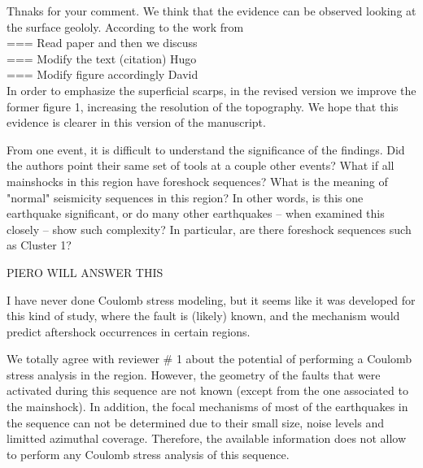 \documentclass[10pt]{extarticle}
\begin{document}
\begin{Answer}
Thnaks for your comment. We think that the evidence can be observed looking at the surface geololy. According to the work from \cite{Falcucci2016active} \\
\hfill === Read paper and then we discuss \\ 
\hfill ===  Modify the text (citation) Hugo \\
\hfill ===  Modify figure accordingly  David\\
In order to emphasize the superficial scarps, in the revised version we improve the former figure 1, increasing the resolution of the topography. We hope that this evidence is clearer in this version of the manuscript.
 \WorkInProgressRevTask
\end{Answer}
%
%



\begin{ReviewerComment}{1}
\noindent 
From one event, it is difficult to understand the significance of the findings. Did the authors point their same set of tools at a couple other events? What if all mainshocks in this region have foreshock sequences? What is the meaning of "normal" seismicity sequences in this region? In other words, is this one earthquake significant, or do many other earthquakes -- when examined this closely -- show such complexity? In particular, are there foreshock sequences such as Cluster 1?

\end{ReviewerComment}


\begin{Answer}
\hfill PIERO WILL ANSWER THIS
 \WorkInProgressRevTask
\end{Answer}
%
%



\begin{ReviewerComment}{1}
\noindent 
I have never done Coulomb stress modeling, but it seems like it was developed for this kind of study, where the fault is (likely) known, and the mechanism would predict aftershock occurrences in certain regions.
\end{ReviewerComment}


\begin{Answer}
We totally agree with reviewer \# 1 about the potential of performing a Coulomb stress analysis in the region. However, the geometry of the faults that were activated during this sequence are not known (except from the one associated to the mainshock). In addition, the focal mechanisms of most of the earthquakes in the sequence can not be determined due to their small size, noise levels and limitted azimuthal coverage. Therefore, the available information does not allow to perform any Coulomb stress analysis of this sequence.
 \WorkInProgressRevTask
\end{Answer}
%
%
\end{document}
